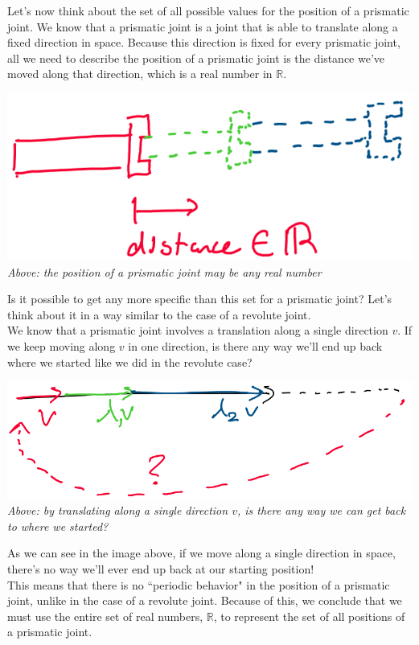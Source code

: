 \documentclass[oneside]{book}
\begin{document}
Let's now think about the set of all possible values for the position of a prismatic joint. We know that a prismatic joint is a joint that is able to translate along a fixed direction in space. Because this direction is fixed for every prismatic joint, all we need to describe the position of a prismatic joint is the distance we've moved along that direction, which is a real number in $\mathbb{R}$.
\begin{center}
    \includegraphics[scale=0.3]{images/prismaticPositions.png}\\
    \textit{Above: the position of a prismatic joint may be any real number}
\end{center}
Is it possible to get any more specific than this set for a prismatic joint? Let's think about it in a way similar to the case of a revolute joint.\\
We know that a prismatic joint involves a translation along a single direction $v$. If we keep moving along $v$ in one direction, is there any way we'll end up back where we started like we did in the revolute case?
\begin{center}
    \includegraphics[scale=0.3]{images/translationR.png}\\
    \textit{Above: by translating along a single direction $v$, is there any way we can get back to where we started?}
\end{center}
As we can see in the image above, if we move along a single direction in space, there's no way we'll ever end up back at our starting position!\\
This means that there is no ``periodic behavior" in the position of a prismatic joint, unlike in the case of a revolute joint. Because of this, we conclude that we must use the entire set of real numbers, $\mathbb{R}$, to represent the set of all positions of a prismatic joint.\\
\end{document}
